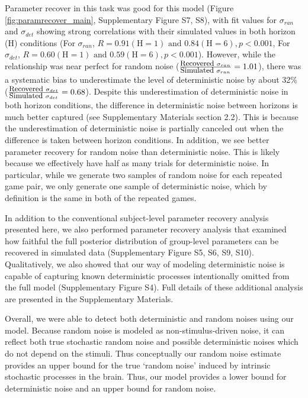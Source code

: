 \documentclass[12pt]{article}
\begin{document}
{Parameter recover in this task was good for this model (Figure \ref{fig:paramrecover_main}, Supplementary Figure S7, S8), with fit values for $\sigma_{ran}$ and $\sigma_{det}$ showing strong correlations with their simulated values in both horizon (H) conditions (For $\sigma_{ran}$, $R = 0.91 (\mbox{H} = 1) \mbox{ and } 0.84 (\mbox{H} = 6), p < 0.001$, For $\sigma_{det}$, $R = 0.60 (\mbox{H} = 1) \mbox{ and } 0.59 (\mbox{H} = 6), p < 0.001$). However, while the relationship was near perfect for random noise ($\frac{\mbox{\small Recovered } \sigma_{ran}}{\mbox{\small Simulated } \sigma_{ran}} = 1.01$), there was a systematic bias to underestimate the level of deterministic noise by about 32\% ($\frac{\mbox{\small Recovered } \sigma_{det}}{\mbox{\small Simulated } \sigma_{det}} = 0.68$). Despite this underestimation of deterministic noise in both horizon conditions, the difference in deterministic noise between horizons is much better captured (see Supplementary Materials section 2.2). This is because the underestimation of deterministic noise is partially canceled out when the difference is taken between horizon conditions. In addition, we see better parameter recovery for random noise than deterministic noise. This is likely because we effectively have half as many trials for deterministic noise. In particular, while we generate two samples of random noise for each repeated game pair, we only generate one sample of deterministic noise, which by definition is the same in both of the repeated games. 		
	
In addition to the conventional subject-level parameter recovery analysis presented here, we also performed parameter recovery analysis that examined how faithful the full posterior distribution of group-level parameters can be recovered in simulated data (Supplementary Figure S5, S6, S9, S10). Qualitatively, we also showed that our way of modeling deterministic noise is capable of capturing known deterministic processes intentionally omitted from the full model (Supplementary Figure S4). Full details of these additional analysis are presented in the Supplementary Materials. 
		
Overall, we were able to detect both deterministic and random noises using our model. Because random noise is modeled as non-stimulus-driven noise, it can reflect both true stochastic random noise and possible deterministic noises which do not depend on the stimuli. Thus conceptually our random noise estimate provides an upper bound for the true `random noise' induced by intrinsic stochastic processes in the brain. Thus, our model provides a lower bound for deterministic noise and an upper bound for random noise. 

}
\end{document}
